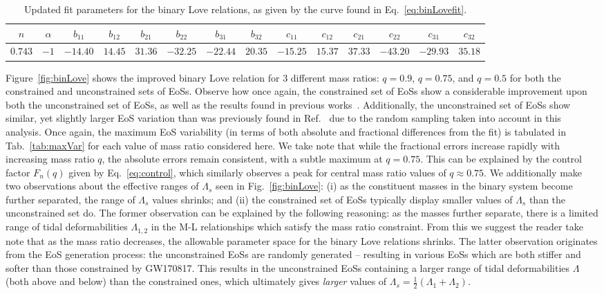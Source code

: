 \documentclass[prd,twocolumn,nofootinbib,superscriptaddress,amsmath,amssymb]{revtex4-1}
\begin{document}
\begin{table*}
\centering
\caption{
Updated fit parameters for the binary Love relations, as given by the curve found in Eq.~\ref{eq:binLovefit}.
}\label{tab:binLovefit}
\addtolength{\tabcolsep}{1pt} 
\begin{tabular}{c  c  c  c  c  c  c  c c c c c c c} 
 \hline
 \hline
$n$ & $\alpha$ & $b_{11}$ & $b_{12}$ & $b_{21}$ & $b_{22}$ & $b_{31}$ & $b_{32}$ & $c_{11}$ & $c_{12}$ & $c_{21}$ & $c_{22}$ & $c_{31}$ & $c_{32}$\\
\hline
$0.743$ & $-1$ & $-14.40$ & $14.45$ & $31.36$ & $-32.25$ & $-22.44$ & $20.35$ & $-15.25$ & $15.37$ & $37.33$ & $-43.20$ & $-29.93$ & $35.18$\\
 \hline
 \hline
\end{tabular}
\addtolength{\tabcolsep}{-1pt}
\end{table*}

Figure~\ref{fig:binLove} shows the improved binary Love relation for 3 different mass ratios: $q=0.9$, $q=0.75$, and $q=0.5$ for both the constrained and unconstrained sets of EoSs.
Observe how once again, the constrained set of EoSs show a considerable improvement upon both the unconstrained set of EoSs, as well as the results found in previous works~\cite{Yagi:binLove}.
Additionally, the unconstrained set of EoSs show similar, yet slightly larger EoS variation than was previously found in Ref.~\cite{Yagi:binLove} due to the random sampling taken into account in this analysis.
Once again, the maximum EoS variability (in terms of both absolute and fractional differences from the fit) is tabulated in Tab.~\ref{tab:maxVar} for each value of mass ratio considered here.
We take note that while the fractional errors increase rapidly with increasing mass ratio $q$, the absolute errors remain consistent, with a subtle maximum at $q=0.75$. 
This can be explained by the control factor $F_n(q)$ given by Eq.~\ref{eq:control}, which similarly observes a peak for central mass ratio values of $q\approx0.75$.
We additionally make two observations about the effective ranges of $\Lambda_s$ seen in Fig.~\ref{fig:binLove}: (i) as the constituent masses in the binary system become further separated, the range of $\Lambda_s$ values shrinks; and (ii) the constrained set of EoSs typically display smaller values of $\Lambda_s$ than the unconstrained set do.
The former observation can be explained by the following reasoning: as the masses further separate, there is a limited range of tidal deformabilities $\Lambda_{1,2}$ in the M-L relationships which satisfy the mass ratio constraint.
From this we suggest the reader take note that as the mass ratio decreases, the allowable parameter space for the binary Love relations shrinks.
The latter observation originates from the EoS generation process: the unconstrained EoSs are randomly generated -- resulting in various EoSs which are both stiffer and softer than those constrained by GW170817.
This results in the unconstrained EoSs containing a larger range of tidal deformabilities $\Lambda$ (both above and below) than the constrained ones, which ultimately gives \emph{larger} values of $\Lambda_s=\frac{1}{2}(\Lambda_1+\Lambda_2)$.
\end{document}
